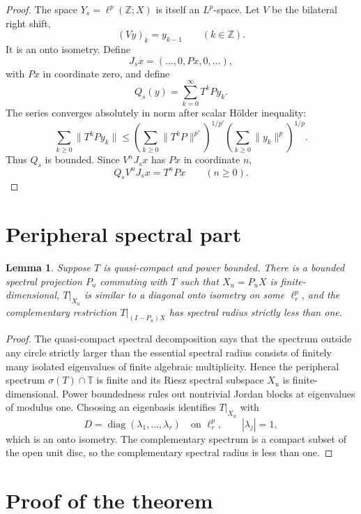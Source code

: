 \documentclass[11pt]{article}
\newtheorem{lemma}[theorem]{Lemma}
\begin{document}
\begin{proof}
The space $Y_s=\ell^p(\mathbb Z;X)$ is itself an $L^p$-space.  Let $V$ be the
bilateral right shift,
\[
 (Vy)_k=y_{k-1}\qquad(k\in\mathbb Z).
\]
It is an onto isometry.  Define
\[
 J_sx=(\ldots,0,Px,0,\ldots),
\]
with $Px$ in coordinate zero, and define
\begin{equation}\label{eq:Qstable}
 Q_s(y)=\sum_{k=0}^{\infty}T^kP y_k.
\end{equation}
The series converges absolutely in norm after scalar H\"older inequality:
\[
 \sum_{k\ge0}\|T^kP y_k\|
 \le
 \left(\sum_{k\ge0}\|T^kP\|^{p'}\right)^{1/p'}
 \left(\sum_{k\ge0}\|y_k\|^p\right)^{1/p}.
\]
Thus $Q_s$ is bounded.  Since $V^nJ_sx$ has $Px$ in coordinate $n$,
\[
 Q_sV^nJ_sx=T^nPx\qquad(n\ge0).
\]
\end{proof}

\section{Peripheral spectral part}

\begin{lemma}\label{lem:peripheral}
Suppose $T$ is quasi-compact and power bounded.  There is a bounded spectral
projection $P_u$ commuting with $T$ such that $X_u=P_uX$ is finite-dimensional,
$T|_{X_u}$ is similar to a diagonal onto isometry on some $\ell^p_r$, and
the complementary restriction $T|_{(I-P_u)X}$ has spectral radius strictly
less than one.
\end{lemma}

\begin{proof}
The quasi-compact spectral decomposition says that the spectrum outside any
circle strictly larger than the essential spectral radius consists of
finitely many isolated eigenvalues of finite algebraic multiplicity.  Hence
the peripheral spectrum $\sigma(T)\cap\mathbb T$ is finite and its Riesz
spectral subspace $X_u$ is finite-dimensional.  Power boundedness rules out
nontrivial Jordan blocks at eigenvalues of modulus one.  Choosing an
eigenbasis identifies $T|_{X_u}$ with
\[
 D=\operatorname{diag}(\lambda_1,\ldots,\lambda_r)
 \quad\text{on }\ell^p_r,
 \qquad |\lambda_j|=1,
\]
which is an onto isometry.  The complementary spectrum is a compact subset
of the open unit disc, so the complementary spectral radius is less than
one.
\end{proof}

\section{Proof of the theorem}
\end{document}
